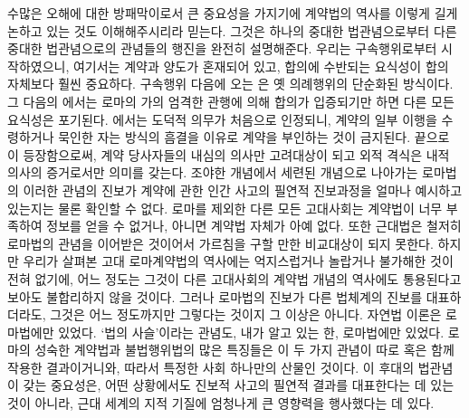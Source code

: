 수많은 오해에 대한 방패막이로서 큰 중요성을 가지기에
계약법의 역사를
이렇게
길게 논하고 있는 것도 이해해주시리라 믿는다.
그것은 하나의 중대한 법관념으로부터
다른 중대한 법관념으로의 관념들의 행진을 완전히 설명해준다.
우리는 구속행위로부터 시작하였으니,
여기서는 계약과 양도가 혼재되어 있고,
합의에 수반되는 요식성이 합의 자체보다 훨씬 중요하다.
구속행위 다음에 오는 은 옛 의례행위의 단순화된 방식이다.
그 다음의 에서는
로마의 가의 엄격한 관행에 의해
합의가 입증되기만 하면 다른 모든 요식성은 포기된다.
에서는 도덕적 의무가 처음으로 인정되니,
계약의 일부 이행을 수령하거나 묵인한 자는
방식의 흠결을 이유로 계약을 부인하는 것이 금지된다.
끝으로 이 등장함으로써,
계약 당사자들의 내심의 의사만 고려대상이 되고
외적 격식은 내적 의사의 증거로서만 의미를 갖는다.
조야한 개념에서 세련된 개념으로 나아가는 로마법의 이러한 관념의 진보가
계약에 관한 인간 사고의 필연적 진보과정을 얼마나 예시하고 있는지는
물론 확인할 수 없다.
로마를 제외한 다른 모든 고대사회는
계약법이 너무 부족하여 정보를 얻을 수 없거나,
아니면 계약법 자체가 아예 없다.
또한 근대법은 철저히 로마법의 관념을 이어받은 것이어서
가르침을 구할 만한 비교대상이 되지 못한다.
하지만 우리가 살펴본 고대 로마계약법의 역사에는
억지스럽거나 놀랍거나 불가해한 것이 전혀 없기에,
어느 정도는 그것이
다른 고대사회의 계약법 개념의 역사에도 통용된다고
보아도 불합리하지 않을 것이다.
그러나 로마법의 진보가 다른 법체계의 진보를 대표하더라도,
그것은 어느 정도까지만 그렇다는 것이지 그 이상은 아니다.
자연법 이론은 로마법에만 있었다.
`법의 사슬'이라는 관념도, 내가 알고 있는 한,
로마법에만 있었다.
로마의 성숙한 계약법과 불법행위법의 많은 특징들은
이 두 가지  관념이 따로 혹은 함께 작용한 결과이거니와,
따라서 특정한 사회 하나만의 산물인 것이다.
이 후대의 법관념이 갖는 중요성은,
어떤 상황에서도 진보적 사고의 필연적 결과를 대표한다는 데
있는 것이 아니라,
근대 세계의 지적 기질에 엄청나게 큰 영향력을 행사했다는 데 있다.


